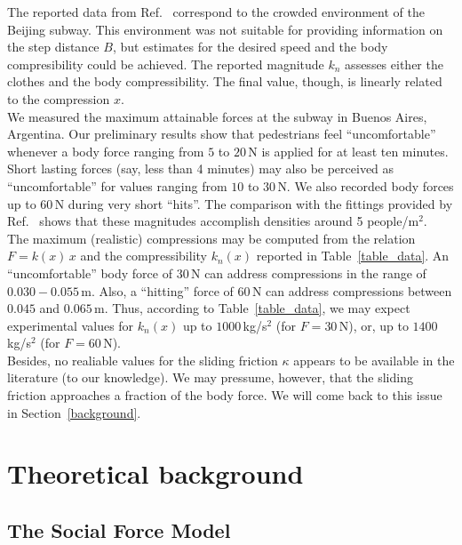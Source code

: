 \documentclass[preprint,12pt]{elsarticle}
\begin{document}
The reported data from Ref.~\cite{song_2019} correspond to the crowded 
environment of the Beijing subway. This environment was not suitable for 
providing information on the step distance $B$, but estimates for the 
desired speed and the body compresibility could be achieved. The reported 
magnitude $k_n$ assesses either the clothes and the body compressibility. The 
final value, though, is linearly related to the compression $x$. \\

We measured the maximum attainable forces at the subway in Buenos Aires, 
Argentina. Our preliminary results show that pedestrians feel ``uncomfortable'' 
whenever a body force ranging from $5$ to $20\,$N is applied for at least ten 
minutes. Short lasting forces (say, less than 4 minutes) may also be perceived 
as ``uncomfortable'' for values ranging from $10$ to $30\,$N. We also recorded body 
forces up to $60\,$N during very short ``hits''. The comparison with the 
fittings provided by Ref.~\cite{song_2019} shows that these magnitudes 
accomplish densities around 5 people/m$^2$.     \\    

The maximum (realistic) compressions may be computed from the relation 
$F=k(x)\,x$ and the compressibility $k_n(x)$ reported in Table~\ref{table_data}. 
An ``uncomfortable'' body force of $30\,$N can address compressions in the 
range of $0.030-0.055\,$m. Also, a ``hitting'' force of $60\,$N can address 
compressions between $0.045$ and $0.065\,$m. Thus, according to 
Table~\ref{table_data}, we may expect experimental values for $k_n(x)$ up to 
$1000\,$kg/s$^2$ (for $F=30\,$N), or, up to $1400\,$kg/s$^2$ (for $F=60\,$N). \\

Besides, no realiable values for the sliding friction $\kappa$ appears to be 
available in the literature (to our knowledge). We may pressume, however, that 
the sliding friction approaches a fraction of the body force. We will come back 
to this issue in Section~\ref{background}. \\


\section{\label{background}Theoretical background}

\subsection{\label{sfm}The Social Force Model}
\end{document}
